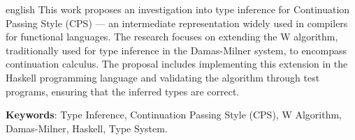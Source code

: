 
\begin{resumo}[Abstract]
  \begin{otherlanguage*}{english}
    This work proposes an investigation into type inference for Continuation Passing Style (CPS) --- an intermediate representation widely used in compilers for functional languages.
    The research focuses on extending the W algorithm, traditionally used for type inference in the Damas-Milner system, to encompass continuation calculus.
    The proposal includes implementing this extension in the Haskell programming language and validating the algorithm through test programs, ensuring that the inferred types are correct.

    \textbf{Keywords}: Type Inference, Continuation Passing Style (CPS), W Algorithm, Damas-Milner, Haskell, Type System.
  \end{otherlanguage*}
\end{resumo}

